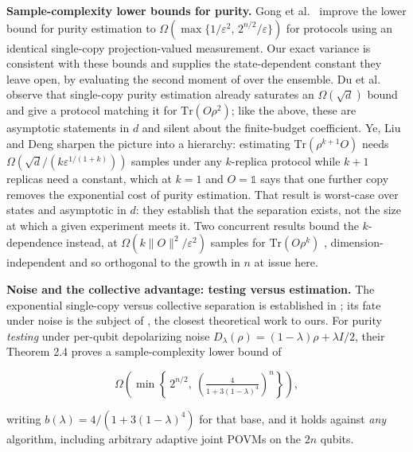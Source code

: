 \documentclass[a4paper,superscriptaddress,nofootinbib,onecolumn,nopdfoutputerror]{quantumarticle}
\begin{document}
\textbf{Sample-complexity lower bounds for purity.} Gong et
al.~\cite{gong2024purity} improve the lower bound for purity estimation to
\(\Omega(\max\{1/\varepsilon^2,\, 2^{n/2}/\varepsilon\})\) for protocols
using an identical single-copy projection-valued measurement. Our exact
variance is consistent with these bounds and supplies the state-dependent
constant they leave open, by evaluating the second moment of
\cite{huang2020shadows} over the ensemble. Du et al.~\cite{du2026optimal}
observe that single-copy purity estimation already saturates an
\(\Omega(\sqrt{d})\) bound and give a protocol matching it for
\(\mathrm{Tr}(O\rho^2)\); like the above, these are asymptotic statements
in \(d\) and silent about the finite-budget coefficient. Ye, Liu and
Deng \cite{ye2025replica} sharpen the picture into a hierarchy: estimating
\(\mathrm{Tr}(\rho^{k+1}O)\) needs \(\Omega(\sqrt{d}/(k\varepsilon^{1/(1+k)}))\)
samples under any \(k\)-replica protocol while \(k+1\) replicas need a
constant, which at \(k = 1\) and \(O = \mathbb{1}\) says that one further
copy removes the exponential cost of purity estimation. That result is
worst-case over states and asymptotic in \(d\): they establish that the separation exists,
not the size at which a given experiment meets it. Two concurrent results
bound the \(k\)-dependence instead, at
\(\Omega(k\lVert O\rVert^2/\varepsilon^2)\) samples for
\(\mathrm{Tr}(O\rho^k)\) \cite{chen2025simultaneous, zhang2025measuring},
dimension-independent and so orthogonal to the growth in \(n\) at issue
here.

\textbf{Noise and the collective advantage: testing versus estimation.} The exponential
single-copy versus collective separation is established in
\cite{huang2022advantage,chen2022separations}; its fate under noise is the
subject of \cite{noisylearning2026}, the closest theoretical work to ours.
For purity \emph{testing} under per-qubit depolarizing noise
\(D_\lambda(\rho) = (1-\lambda)\rho + \lambda I/2\), their Theorem 2.4
proves a sample-complexity lower bound of

\[
\Omega\!\left(\min\left\{\,2^{n/2},\ \left(\tfrac{4}{1 + 3(1-\lambda)^4}\right)^{n}\right\}\right),
\]

writing \(b(\lambda) = 4/(1 + 3(1-\lambda)^4)\) for that base, and it
holds against \emph{any} algorithm, including arbitrary adaptive joint
POVMs on the \(2n\) qubits.
\end{document}
